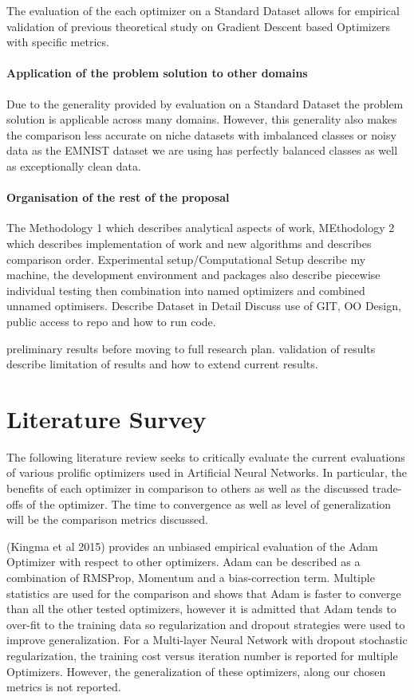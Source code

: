 \documentclass{article}
\begin{document}
	The evaluation of the each optimizer on a Standard Dataset allows for empirical validation of previous theoretical study on Gradient Descent based Optimizers with specific metrics.
	\paragraph{Application of the problem solution to other domains}
	
	Due to the generality provided by evaluation on a Standard Dataset the problem solution is applicable across many domains. However, this generality also makes the comparison less accurate on niche datasets with imbalanced classes or noisy data as the EMNIST dataset we are using has perfectly balanced classes as well as exceptionally clean data. 
	
	
	\paragraph{Organisation of the rest of the proposal}
	
	The
	Methodology 1 which describes analytical aspects of work,
	MEthodology 2 which describes implementation of work and new algorithms and describes comparison order.
	Experimental setup/Computational Setup describe my machine, the development environment and packages
	also describe piecewise individual testing then combination into named optimizers and combined unnamed optimisers.
	Describe Dataset in Detail 
	Discuss use of GIT, OO Design, public access to repo and how to run code.
	
	preliminary results before moving to full research plan.
	validation of results
	describe limitation of results and how to extend current results.
	
	
\section{Literature Survey}	
The following literature review seeks to critically evaluate the current evaluations of various prolific optimizers used in Artificial Neural Networks. In particular, the benefits of each optimizer in comparison to others as well as the discussed trade-offs of the optimizer. The time to convergence as well as level of generalization will be the comparison metrics discussed.


(Kingma et al 2015) provides an unbiased empirical evaluation of the Adam Optimizer with respect to other optimizers. Adam can be described as a combination of RMSProp, Momentum and a bias-correction term.
Multiple statistics are used for the comparison and shows that Adam is faster to converge than all the other tested optimizers, however it is admitted that Adam tends to over-fit to the training data so regularization and dropout strategies were used to improve generalization. For a Multi-layer Neural Network with dropout stochastic regularization, the training cost versus iteration number is reported for multiple Optimizers. However, the generalization of these optimizers, along our chosen metrics is not reported.
\end{document}
